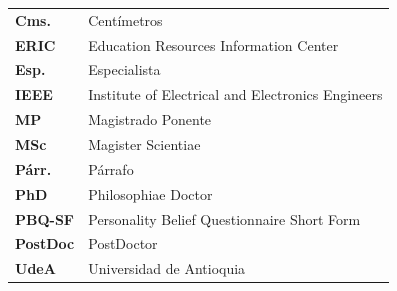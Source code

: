 \pagestyle{fancy}



\begin{center}
    \textbf{\titleNomenclature}
\end{center}


\begin{tabular}{m{2cm}p{10cm}}
    \textbf{Cms.}	    &	Centímetros\\
    \textbf{ERIC}	    &	Education Resources Information Center\\
    \textbf{Esp.}	    &	Especialista\\
    \textbf{IEEE}		  &	Institute of Electrical and Electronics Engineers \\
    \textbf{MP}		    &	Magistrado Ponente\\
    \textbf{MSc}		  &	Magister Scientiae\\
    \textbf{Párr.}	  &	Párrafo\\
    \textbf{PhD}		  &	Philosophiae Doctor\\
    \textbf{PBQ-SF} 	&	Personality Belief Questionnaire Short Form\\
    \textbf{PostDoc}	&	PostDoctor\\
    \textbf{UdeA}	    &	Universidad de Antioquia
\end{tabular}

